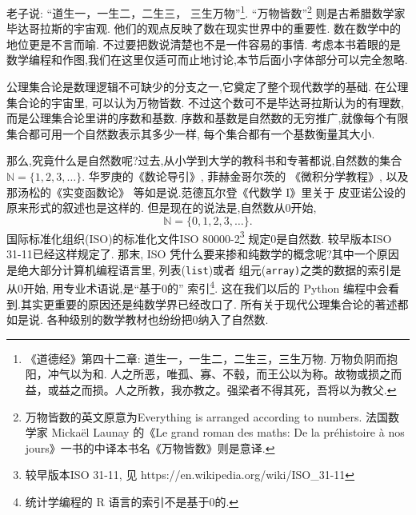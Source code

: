 老子说: “道生一，一生二，二生三，
三生万物”\footnote{《道德经》第四十二章: 道生一，一生二，二生三，三生万物. 万物负阴而抱阳，冲气以为和. 人之所恶，唯孤、寡、不毂，而王公以为称。故物或损之而益，或益之而损。人之所教，我亦教之。强梁者不得其死，吾将以为教父.}.
“万物皆数”\footnote{万物皆数的英文原意为Everything is arranged according to numbers. 
	法国数学家 Mickaël Launay 的《Le grand roman des maths: De la préhistoire à nos jours》一书的中译本书名《万物皆数》则是意译.}
则是古希腊数学家毕达哥拉斯的宇宙观. 他们的观点反映了数在现实世界中的重要性. 数在数学中的地位更是不言而喻.
不过要把数说清楚也不是一件容易的事情. 考虑本书着眼的是数学编程和作图,我们在这里仅适可而止地讨论,本节后面小字体部分可以完全怱略. 

公理集合论是数理逻辑不可缺少的分支之一,它奠定了整个现代数学的基础. 在公理集合论的宇宙里, 可以认为万物皆数. 
不过这个数可不是毕达哥拉斯认为的有理数, 而是公理集合论里讲的序数和基数.
序数和基数是自然数的无穷推广,就像每个有限集合都可用一个自然数表示其多少一样,
每个集合都有一个基数衡量其大小.

那么,究竟什么是自然数呢?过去,从小学到大学的教科书和专著都说,自然数的集合$\mathbb{N} = \{1, 2, 3, \dots\}$.
华罗庚的《数论导引》\cite{HuaL}, 菲赫金哥尔茨的
《微积分学教程》\cite{FeiH1}, 以及那汤松的《实变函数论》\cite{Natanco}
等如是说.范德瓦尔登《代数学 I》\cite{derWaerden}里关于
皮亚诺公设的原来形式的叙述也是这样的.
但是现在的说法是,自然数从0开始, 
$$\mathbb{N} = \{0,1, 2, 3, \dots\}.$$
 国际标准化组织(ISO)的标准化文件ISO 80000-2\footnote{较早版本ISO 31-11, 见  https://en.wikipedia.org/wiki/ISO\_31-11}
 规定0是自然数. 较早版本ISO 31-11已经这样规定了.
 那末, ISO 凭什么要来掺和纯数学的概念呢?其中一个原因是绝大部分计算机编程语言里,
 列表(\texttt{list})或者
 组元(\texttt{array)}之类的数据的索引是从0开始,
 用专业术语说,是“基于0的”
 索引\footnote{统计学编程的 R 语言的索引不是基于0的.}.
 这在我们以后的 Python 编程中会看到.其实更重要的原因还是纯数学界已经改口了.
 所有关于现代公理集合论的著述都如是说\cite{HalmosP}\cite{KelleyJ}\cite{JiangJi}. 各种级别的数学教材也纷纷把0纳入了自然数.
 
